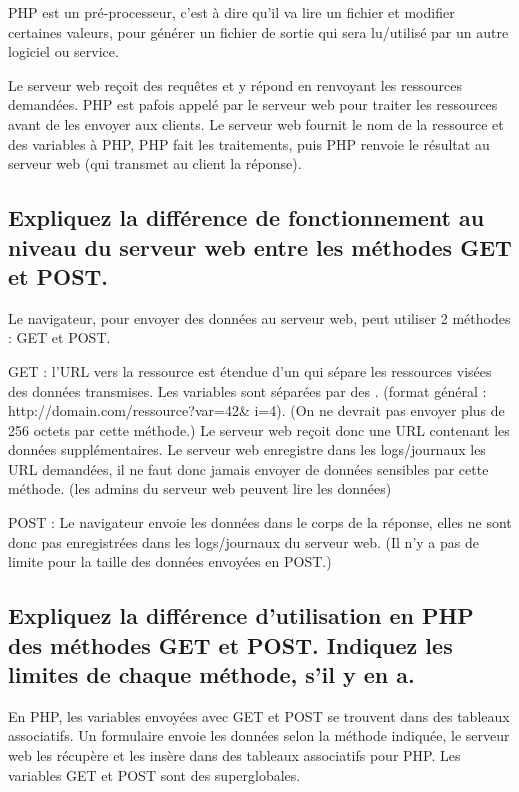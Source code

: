 \documentclass[11pt,a4paper]{article}
\begin{document}
PHP est un pré-processeur, c'est à dire qu'il va lire un fichier et modifier certaines valeurs, pour générer un fichier de sortie qui sera lu/utilisé par un autre logiciel ou service.

Le serveur web reçoit des requêtes et y répond en renvoyant les ressources demandées.
PHP est pafois appelé par le serveur web pour traiter les ressources avant de les envoyer aux clients.
Le serveur web fournit le nom de la ressource et des variables à PHP, PHP fait les traitements, puis PHP renvoie le résultat au serveur web (qui transmet au client la réponse).

\bigskip

\subsection{Expliquez la différence de fonctionnement au niveau du serveur web entre les méthodes GET et POST.}

\bigskip

Le navigateur, pour envoyer des données au serveur web, peut utiliser 2 méthodes : GET et POST.

GET : l'URL vers la ressource est étendue d'un  qui sépare les ressources visées des données transmises.
Les variables sont séparées par des \TTBF{\&}. (format général : http://domain.com/ressource?var=42\& i=4).
(On ne devrait pas envoyer plus de 256 octets par cette méthode.)
Le serveur web reçoit donc une URL contenant les données supplémentaires.
Le serveur web enregistre dans les logs/journaux les URL demandées, il ne faut donc jamais envoyer de données sensibles par cette méthode. (les admins du serveur web peuvent lire les données)

POST : Le navigateur envoie les données dans le corps de la réponse, elles ne sont donc pas enregistrées dans les logs/journaux du serveur web.
(Il n'y a pas de limite pour la taille des données envoyées en POST.)

\bigskip

\subsection{Expliquez la différence d'utilisation en PHP des méthodes GET et POST. Indiquez les limites de chaque méthode, s'il y en a.}

\bigskip

En PHP, les variables envoyées avec GET et POST se trouvent dans des tableaux associatifs.
Un formulaire envoie les données selon la méthode indiquée, le serveur web les récupère et les insère dans des tableaux associatifs pour PHP.
Les variables GET et POST sont des superglobales.
\end{document}
